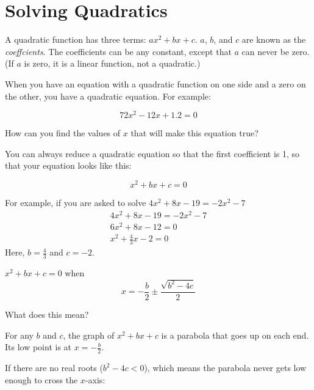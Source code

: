 \chapter{Solving Quadratics}

A quadratic function has three terms: $ax^2 + bx + c$. $a$, $b$, and
$c$ are known as the \textit{coeffcients}. The coefficients can be any
constant, except that $a$ can never be zero. (If $a$ is zero, it is a linear
function, not a quadratic.)

When you have an equation with a quadratic function on one side and a
zero on the other, you have a quadratic equation. For example:

$$72x^2 - 12x + 1.2 = 0$$

How can you find the values of $x$ that will make this equation true?

You can always reduce a quadratic equation so that the first
coefficient is 1, so that your equation looks like this:

$$x^2 +bx + c = 0$$

For example, if you are asked to solve $4x^2 + 8x - 19 = -2x^2 - 7$
\begin{multline*}
  4x^2 + 8x - 19 = -2x^2 - 7 \\
  6x^2 + 8x -12 = 0 \\
  x^2 + \frac{4}{3}x - 2 = 0
\end{multline*}
Here, $b = \frac{4}{3}$ and $c = -2$.

\begin{mdframed}[style=important]
$x^2 + bx + c = 0$ when
\begin{equation*}
x = -\frac{b}{2} \pm \frac{\sqrt{b^2 - 4c}}{2}  
\end{equation*}
\end{mdframed}

What does this mean?

For any $b$ and $c$, the graph of $x^2 + bx + c$ is a parabola
that goes up on each end. Its low point is at $x = -\frac{b}{2}$.

If there are no real roots ($b^2 - 4c < 0$), which means the
parabola never gets low enough to cross the $x$-axis:


